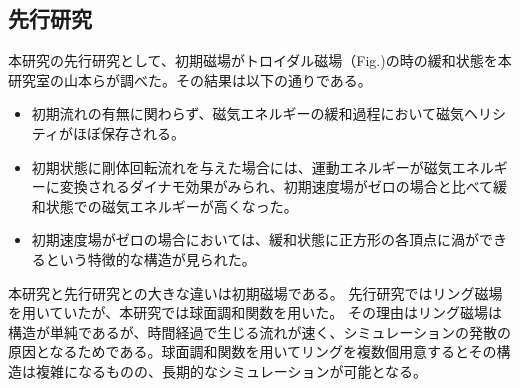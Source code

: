 \documentclass[12pt]{jsarticle}
\begin{document}


\subsection{先行研究}
本研究の先行研究として、初期磁場がトロイダル磁場（Fig.)の時の緩和状態を本研究室の山本らが調べた。その結果は以下の通りである。
\begin{itemize}
\item 初期流れの有無に関わらず、磁気エネルギーの緩和過程において磁気ヘリシティがほぼ保存される。
\item 初期状態に剛体回転流れを与えた場合には、運動エネルギーが磁気エネルギーに変換されるダイナモ効果がみられ、初期速度場がゼロの場合と比べて緩和状態での磁気エネルギーが高くなった。
\item 初期速度場がゼロの場合においては、緩和状態に正方形の各頂点に渦ができるという特徴的な構造が見られた。
\end{itemize}
本研究と先行研究との大きな違いは初期磁場である。
先行研究ではリング磁場を用いていたが、本研究では球面調和関数を用いた。
その理由はリング磁場は構造が単純であるが、時間経過で生じる流れが速く、シミュレーションの発散の原因となるためである。球面調和関数を用いてリングを複数個用意するとその構造は複雑になるものの、長期的なシミュレーションが可能となる。
 
\end{document}
